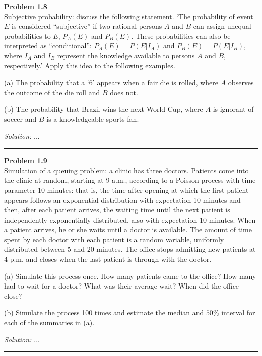 \documentclass[a4paper, 11pt]{article}
\newenvironment{problem}[2][Problem]
    { \begin{mdframed}[backgroundcolor=gray!20] \textbf{#1 #2} \\}
    {  \end{mdframed}}
\newenvironment{solution}
    {\textit{Solution:}}
    {}
\begin{document}
\begin{problem}{1.8}
Subjective probability: discuss the following statement. ‘The probability of event $E$ is considered “subjective” 
if two rational persons $A$ and $B$ can assign unequal probabilities to $E$, $P_A(E)$ and $P_B(E)$.
These probabilities can also be interpreted as “conditional”: $P_A(E) = P(E|I_A)$ and $P_B(E) = P(E|I_B)$, 
where $I_A$ and $I_B$ represent the knowledge available to persons $A$ and $B$, respectively.’
 Apply this idea to the following examples.

(a) The probability that a ‘6’ appears when a fair die is rolled, where $A$ observes the outcome of the die roll 
and $B$ does not.

(b) The probability that Brazil wins the next World Cup, where $A$ is ignorant of soccer and $B$ is a knowledgeable sports fan.
\end{problem}
\begin{solution}
...
\end{solution}

\noindent\rule{7in}{2.8pt}

\begin{problem}{1.9}
Simulation of a queuing problem: a clinic has three doctors. Patients come into the clinic at random, 
starting at 9 a.m., according to a Poisson process with time parameter 10 minutes: that is, 
the time after opening at which the first patient appears follows an exponential distribution with expectation 
10 minutes and then, after each patient arrives, the waiting time until the next patient is independently 
exponentially distributed, also with expectation 10 minutes. When a patient arrives, he or she waits until a doctor 
is available. The amount of time spent by each doctor with each patient is a random variable, uniformly distributed 
between 5 and 20 minutes. The office stops admitting new patients at 4 p.m. and closes when the last patient is 
through with the doctor.

(a) Simulate this process once. How many patients came to the office? How many had to wait for a doctor? What was their average wait? When did the office close?

(b) Simulate the process 100 times and estimate the median and $50\%$ interval for each of the summaries in (a). 
\end{problem}
\begin{solution}
...
\end{solution}

\noindent\rule{7in}{2.8pt}
\end{document}
